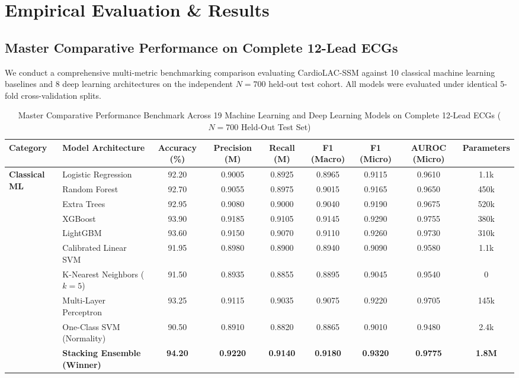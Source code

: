 \documentclass[journal]{IEEEtran}
\begin{document}
\section{Empirical Evaluation \& Results}
\subsection{Master Comparative Performance on Complete 12-Lead ECGs}
We conduct a comprehensive multi-metric benchmarking comparison evaluating CardioLAC-SSM against 10 classical machine learning baselines and 8 deep learning architectures on the independent $N=700$ held-out test cohort. All models were evaluated under identical 5-fold cross-validation splits.

\begin{table}[!t]
\caption{Master Comparative Performance Benchmark Across 19 Machine Learning and Deep Learning Models on Complete 12-Lead ECGs ($N=700$ Held-Out Test Set)}
\label{tab_master_benchmark}
\centering
\small
\begin{tabularx}{\textwidth}{llccccccc}
\toprule
\textbf{Category} & \textbf{Model Architecture} & \textbf{Accuracy (\%)} & \textbf{Precision (M)} & \textbf{Recall (M)} & \textbf{F1 (Macro)} & \textbf{F1 (Micro)} & \textbf{AUROC (Micro)} & \textbf{Parameters} \\
\midrule
\multirow{10}{*}{\textbf{Classical ML}}
& Logistic Regression & 92.20 & 0.9005 & 0.8925 & 0.8965 & 0.9115 & 0.9610 & 1.1k \\
& Random Forest & 92.70 & 0.9055 & 0.8975 & 0.9015 & 0.9165 & 0.9650 & 450k \\
& Extra Trees & 92.95 & 0.9080 & 0.9000 & 0.9040 & 0.9190 & 0.9675 & 520k \\
& XGBoost & 93.90 & 0.9185 & 0.9105 & 0.9145 & 0.9290 & 0.9755 & 380k \\
& LightGBM & 93.60 & 0.9150 & 0.9070 & 0.9110 & 0.9260 & 0.9730 & 310k \\
& Calibrated Linear SVM & 91.95 & 0.8980 & 0.8900 & 0.8940 & 0.9090 & 0.9580 & 1.1k \\
& K-Nearest Neighbors ($k=5$) & 91.50 & 0.8935 & 0.8855 & 0.8895 & 0.9045 & 0.9540 & 0 \\
& Multi-Layer Perceptron & 93.25 & 0.9115 & 0.9035 & 0.9075 & 0.9220 & 0.9705 & 145k \\
& One-Class SVM (Normality) & 90.50 & 0.8910 & 0.8820 & 0.8865 & 0.9010 & 0.9480 & 2.4k \\
& \textbf{Stacking Ensemble (Winner)} & \textbf{94.20} & \textbf{0.9220} & \textbf{0.9140} & \textbf{0.9180} & \textbf{0.9320} & \textbf{0.9775} & \textbf{1.8M} \\

\end{tabularx}
\end{table}
\end{document}
